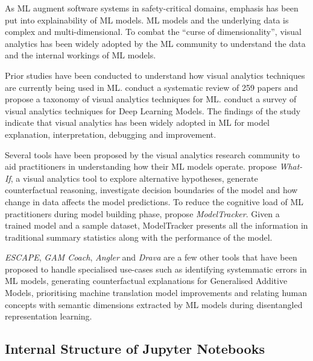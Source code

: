 \documentclass[acmsmall,screen,review,anonymous]{acmart}
\begin{document}
As ML augment software systems in safety-critical domains, emphasis has been put into explainability of ML models. ML models and the underlying data is complex and multi-dimensional. To combat the ``curse of dimensionality'', visual analytics has been widely adopted by the ML community to understand the data and the internal workings of ML models.

Prior studies have been conducted to understand how visual analytics techniques are currently being used in ML. \citeauthor{yuan2021survey} conduct a systematic review of 259 papers and propose a taxonomy of visual analytics techniques for ML. \citeauthor{hohman2019visual} conduct a survey of visual analytics techniques for Deep Learning Models. The findings of the study indicate that visual analytics has been widely adopted in ML for model explanation, interpretation, debugging and improvement.

Several tools have been proposed by the visual analytics research community to aid practitioners in understanding how their ML models operate. \citeauthor{wexler2020if} propose \textit{What-If}, a visual analytics tool to explore alternative hypotheses, generate counterfactual reasoning, investigate decision boundaries of the model and how change in data affects the model predictions. To reduce the cognitive load of ML practitioners during model building phase, \citeauthor{amershi2015modeltracker} propose \textit{ModelTracker}. Given a trained model and a sample dataset, ModelTracker presents all the information in traditional summary statistics along with the performance of the model.

\textit{ESCAPE}, \textit{GAM Coach}, \textit{Angler} and \textit{Drava} are a few other tools that have been proposed to handle specialised use-cases such as identifying systemmatic errors in ML models, generating counterfactual explanations for Generalised Additive Models, prioritising machine translation model improvements and relating human concepts with semantic dimensions extracted by ML models during disentangled representation learning\cite{ahn2023escape, wang2023gam, robertson2023angler, wang2023drava}.

\subsection{Internal Structure of Jupyter Notebooks}\label{sec:nbformat}
\end{document}
